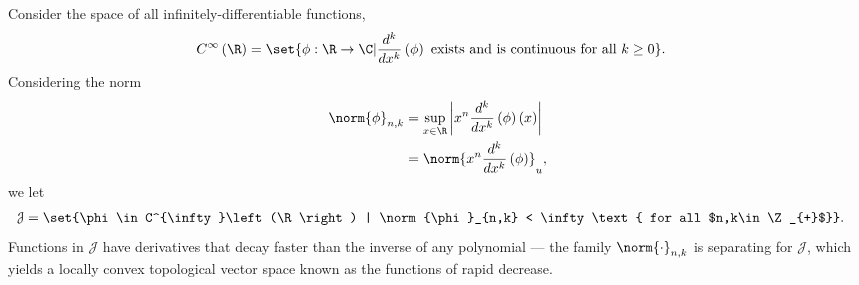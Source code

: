 \documentclass[10pt]{mypackage}
\begin{document}
\begin{example}
  Consider the space of all infinitely-differentiable functions,
  \begin{align*}
    C^{\infty}\left(\R\right) &= \set{\phi: \R\rightarrow \C | \frac{d^k}{dx^k}\left(\phi\right)\text{ exists and is continuous for all }k\geq 0}.
  \end{align*}
  Considering the norm
  \begin{align*}
    \norm{\phi}_{n,k} &= \sup_{x\in \R}\left\vert x^n \frac{d^{k}}{dx^k}\left(\phi\right)\left(x\right) \right\vert\\
                      &= \norm{x^n\frac{d^{k}}{dx^k}\left(\phi\right)}_{u},
  \end{align*}
  we let
  \begin{align*}
    \mathcal{J} &= \set{\phi\in C^{\infty}\left(\R\right) | \norm{\phi}_{n,k} < \infty\text{ for all $n,k\in \Z_{+}$}}.
  \end{align*}
  Functions in $\mathcal{J}$ have derivatives that decay faster than the inverse of any polynomial --- the family $\norm{\cdot}_{n,k}$ is separating for $\mathcal{J}$, which yields a locally convex topological vector space known as the functions of rapid decrease.
\end{example}
\end{document}
